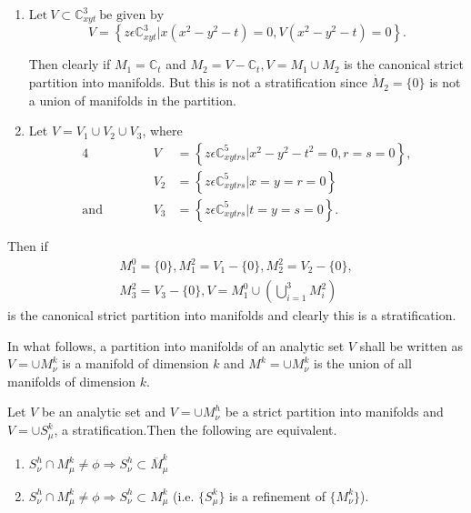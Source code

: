 \setcounter{examples}{0}
\begin{examples*} %
\begin{enumerate}
\item $\text{Let}~ V \subset \mathbb{C}^{3}_{xyt} ~\text{be given by} $
    $$ 
    V= \left\{ z \epsilon  \mathbb{C}^{3}_{xyt} \big| x (x^2-y^2 -t) =
    0, V(x^2-y^2-t) = 0 \right\}. 
    $$

    Then clearly if $M_1 = \mathbb{C}_{t}$ and  $M_2 = V - \mathbb{C}_{t},
    V= M_1 \cup M_2$ is the canonical strict partition into
    manifolds. But this is not a stratification since $\dot{M}_2 =
    \{0\}$ is not a union of manifolds in the partition. 

  \item Let $V = V_1 \cup  V_2 \cup V_3$,  where
    \begin{alignat*}{4}
      && V &= \left\{ z \epsilon \mathbb{C}^{5}_{xytrs} \big| x^2-y^2-t^2 =
    0,r= s=0 \right\},\\
    && V_2  & =  \left\{ z \epsilon  \mathbb{C}^{5}_{xytrs} \big| x=y = r =
    0  \right\} \\
    \text{and}&\hspace{1cm} & V_3& = \left\{z \epsilon \mathbb{C}^{5}_{xytrs}
    \big| t=y=s=0 \right\}. 
    \end{alignat*}
\end{enumerate}

Then if 
\begin{multline*}
  M^0 _1 = \{0\}, M^2 _1 = V_1- \{0\}, M^2_2  = V_2-\{0\},\\ 
  M^2 _3 = V_3
  -\{0\},  V = M^0_1 \cup \left(\bigcup \limits ^{3}_{i=1} M^2_i\right) 
\end{multline*}
is the  canonical strict partition into manifolds  and clearly this is
a stratification. 
\end{examples*}

\begin{notation*} %
  In what follows, a partition into manifolds of an analytic set $V$
  shall be written as $V = \cup M^k_\nu$ is a manifold of dimension
  $k$ and $M^k  = \cup M^k_\nu$ is the union of all manifolds of
  dimension $k$. 
\end{notation*}

\begin{lemma}\label{chap2-lem4} %
  Let $V$ be an analytic set and $V = \cup M^h_\nu$ be a strict
  partition into manifolds and $V= \cup S^k_\mu$, a
  stratification.Then the following are equivalent. 
\begin{enumerate}[(1)]
\item $S^{h}_{\nu} \cap M^{k}_{\mu} \neq \phi \Rightarrow S^{h}_{\nu}
  \subset \overline {M}^{k}_{\mu}$\pageoriginale
\item $ S^{h}_{\nu} \cap M^{k}_{\mu} \neq \phi \Rightarrow S^{h}_{\nu}
  \subset  M^{k}_{\mu}$ (i.e. $\{ S^{k}_{\mu }\}$ is a refinement
    of  $\{ M^{k}_{\nu}\}$). 
\end{enumerate} 
\end{lemma}

